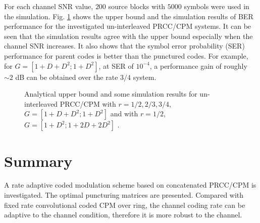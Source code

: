 \documentclass[12pt,twoside,onecolumn,a4paper,english]{IEEEtran2e}
\begin{document}
For each channel SNR
value, $200$ source blocks with $5000$ symbols were used in the
simulation. Fig. \ref{fig:BERbound_PRCCCPM}  shows the upper bound and the simulation
results of BER performance for the investigated un-interleaved PRCC/CPM systems. It can be
seen that the simulation results agree with the upper bound especially when the channel SNR increases. It also shows that the
symbol error probability (SER) performance for parent codes is better than the punctured codes.  For example, for $G=[1+D+D^2;1+D^2]$, at SER of $10^{-4}$, %
a performance gain of roughly $\sim 2$ dB can be obtained
over the rate $3/4$ system.

\begin{figure}[htb]
\begin{center}
\mbox{}
\vspace{20ex}
\caption{Analytical upper bound and some simulation results for un-interleaved PRCC/CPM with
$r=1/2,2/3,3/4$, $G=[1+D+D^2;1+D^2]$ and with $r=1/2$, $G=[1+D^2;1+2D+2D^2]$ .
} \label{fig:BERbound_PRCCCPM}%
\vspace{6ex}
\end{center}
\end{figure}
\vspace{6ex}

\section{Summary}\label{sec:jscconclusion}

A rate adaptive coded modulation scheme based on concatenated PRCC/CPM
is investigated. The optimal puncturing matrices are presented. Compared with fixed rate convolutional coded CPM over ring, the channel coding rate can be adaptive to the channel condition, therefore it is more robust to the channel.
\end{document}
